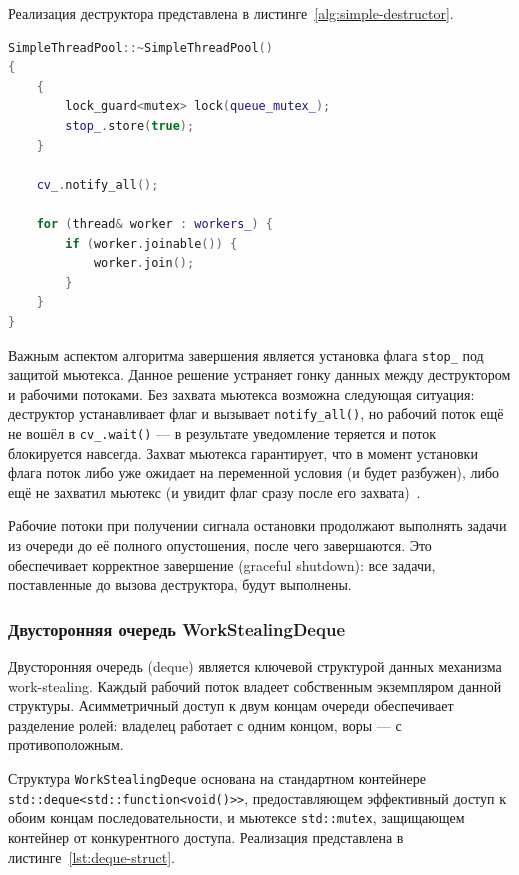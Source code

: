 Реализация деструктора представлена
в листинге~\ref{alg:simple-destructor}.

\begin{lstlisting}[language=C++,
                   caption={Алгоритм завершения работы
                            SimpleThreadPool},
                   label={alg:simple-destructor}]
SimpleThreadPool::~SimpleThreadPool()
{
    {
        lock_guard<mutex> lock(queue_mutex_);
        stop_.store(true);
    }

    cv_.notify_all();

    for (thread& worker : workers_) {
        if (worker.joinable()) {
            worker.join();
        }
    }
}
\end{lstlisting}

Важным аспектом алгоритма завершения является установка флага
\texttt{stop\_} под защитой мьютекса. Данное решение устраняет
гонку данных между деструктором и рабочими потоками. Без захвата
мьютекса возможна следующая ситуация: деструктор устанавливает
флаг и вызывает \texttt{notify\_all()}, но рабочий поток ещё не
вошёл в \texttt{cv\_.wait()} --- в результате уведомление теряется
и поток блокируется навсегда. Захват мьютекса гарантирует, что
в момент установки флага поток либо уже ожидает на переменной
условия (и будет разбужен), либо ещё не захватил мьютекс
(и увидит флаг сразу после его захвата)~\cite{Williams2019}.

Рабочие потоки при получении сигнала остановки продолжают
выполнять задачи из очереди до её полного опустошения, после
чего завершаются. Это обеспечивает корректное завершение
(graceful shutdown): все задачи, поставленные до вызова
деструктора, будут выполнены.

\subsubsection{Двусторонняя очередь WorkStealingDeque}

Двусторонняя очередь (deque) является ключевой структурой данных
механизма work-stealing. Каждый рабочий поток владеет собственным
экземпляром данной структуры. Асимметричный доступ к двум концам
очереди обеспечивает разделение ролей: владелец работает с одним
концом, воры --- с противоположным.

Структура \texttt{WorkStealingDeque} основана на стандартном
контейнере \texttt{std::deque<std::function<void()>>},
предоставляющем эффективный доступ к обоим концам последовательности,
и мьютексе \texttt{std::mutex}, защищающем контейнер от
конкурентного доступа. Реализация представлена
в листинге~\ref{lst:deque-struct}.

